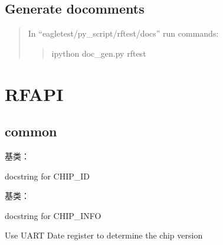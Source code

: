 \documentclass[letterpaper,10pt,english]{sphinxhowto}
\begin{document}
\subsection{Generate docomments}
\label{\detokenize{quick_start/quick_start:generate-docomments}}\begin{quote}

In “eagletest/py\_script/rftest/docs” run commands:
\begin{quote}

ipython doc\_gen.py rftest
\end{quote}
\end{quote}


\section{RFAPI}
\label{\detokenize{rfapi/index:rfapi}}\label{\detokenize{rfapi/index::doc}}

\subsection{common}
\label{\detokenize{rfapi/index:module-common}}\label{\detokenize{rfapi/index:common}}

\begin{fulllineitems}
\label{\detokenize{rfapi/index:common.CHIP_ID}}
基类：

docstring for CHIP\_ID

\begin{fulllineitems}
\label{\detokenize{rfapi/index:common.CHIP_ID.chip_mac}}
\end{fulllineitems}


\end{fulllineitems}


\begin{fulllineitems}
\label{\detokenize{rfapi/index:common.CHIP_INFO}}
基类：

docstring for CHIP\_INFO

\begin{fulllineitems}
\label{\detokenize{rfapi/index:common.CHIP_INFO.get_chipv}}
Use UART Date register to determine the chip version

\end{fulllineitems}


\end{fulllineitems}
\end{document}
